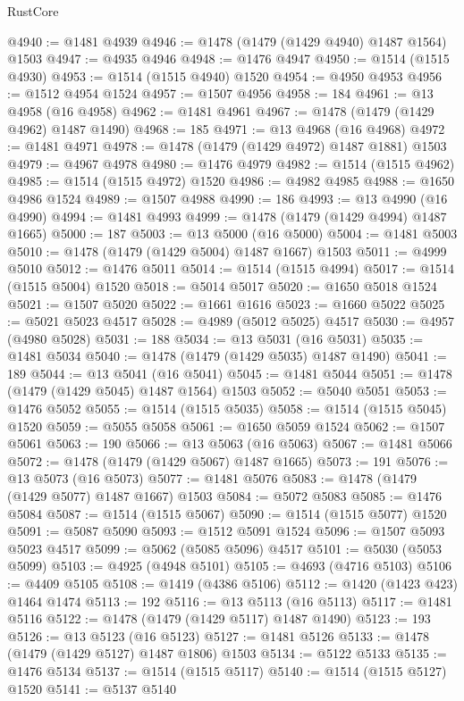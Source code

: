 \begin{lexlean}{RustCore}
\begin{coremodule}
@4940 := @1481 @4939
@4946 := @1478 (@1479 (@1429 @4940) @1487 @1564) @1503
@4947 := @4935 @4946
@4948 := @1476 @4947
@4950 := @1514 (@1515 @4930)
@4953 := @1514 (@1515 @4940) @1520
@4954 := @4950 @4953
@4956 := @1512 @4954 @1524
@4957 := @1507 @4956
@4958 := 184
@4961 := @13 @4958 (@16 @4958)
@4962 := @1481 @4961
@4967 := @1478 (@1479 (@1429 @4962) @1487 @1490)
@4968 := 185
@4971 := @13 @4968 (@16 @4968)
@4972 := @1481 @4971
@4978 := @1478 (@1479 (@1429 @4972) @1487 @1881) @1503
@4979 := @4967 @4978
@4980 := @1476 @4979
@4982 := @1514 (@1515 @4962)
@4985 := @1514 (@1515 @4972) @1520
@4986 := @4982 @4985
@4988 := @1650 @4986 @1524
@4989 := @1507 @4988
@4990 := 186
@4993 := @13 @4990 (@16 @4990)
@4994 := @1481 @4993
@4999 := @1478 (@1479 (@1429 @4994) @1487 @1665)
@5000 := 187
@5003 := @13 @5000 (@16 @5000)
@5004 := @1481 @5003
@5010 := @1478 (@1479 (@1429 @5004) @1487 @1667) @1503
@5011 := @4999 @5010
@5012 := @1476 @5011
@5014 := @1514 (@1515 @4994)
@5017 := @1514 (@1515 @5004) @1520
@5018 := @5014 @5017
@5020 := @1650 @5018 @1524
@5021 := @1507 @5020
@5022 := @1661 @1616
@5023 := @1660 @5022
@5025 := @5021 @5023 @4517
@5028 := @4989 (@5012 @5025) @4517
@5030 := @4957 (@4980 @5028)
@5031 := 188
@5034 := @13 @5031 (@16 @5031)
@5035 := @1481 @5034
@5040 := @1478 (@1479 (@1429 @5035) @1487 @1490)
@5041 := 189
@5044 := @13 @5041 (@16 @5041)
@5045 := @1481 @5044
@5051 := @1478 (@1479 (@1429 @5045) @1487 @1564) @1503
@5052 := @5040 @5051
@5053 := @1476 @5052
@5055 := @1514 (@1515 @5035)
@5058 := @1514 (@1515 @5045) @1520
@5059 := @5055 @5058
@5061 := @1650 @5059 @1524
@5062 := @1507 @5061
@5063 := 190
@5066 := @13 @5063 (@16 @5063)
@5067 := @1481 @5066
@5072 := @1478 (@1479 (@1429 @5067) @1487 @1665)
@5073 := 191
@5076 := @13 @5073 (@16 @5073)
@5077 := @1481 @5076
@5083 := @1478 (@1479 (@1429 @5077) @1487 @1667) @1503
@5084 := @5072 @5083
@5085 := @1476 @5084
@5087 := @1514 (@1515 @5067)
@5090 := @1514 (@1515 @5077) @1520
@5091 := @5087 @5090
@5093 := @1512 @5091 @1524
@5096 := @1507 @5093 @5023 @4517
@5099 := @5062 (@5085 @5096) @4517
@5101 := @5030 (@5053 @5099)
@5103 := @4925 (@4948 @5101)
@5105 := @4693 (@4716 @5103)
@5106 := @4409 @5105
@5108 := @1419 (@4386 @5106)
@5112 := @1420 (@1423 @423) @1464 @1474
@5113 := 192
@5116 := @13 @5113 (@16 @5113)
@5117 := @1481 @5116
@5122 := @1478 (@1479 (@1429 @5117) @1487 @1490)
@5123 := 193
@5126 := @13 @5123 (@16 @5123)
@5127 := @1481 @5126
@5133 := @1478 (@1479 (@1429 @5127) @1487 @1806) @1503
@5134 := @5122 @5133
@5135 := @1476 @5134
@5137 := @1514 (@1515 @5117)
@5140 := @1514 (@1515 @5127) @1520
@5141 := @5137 @5140

\end{coremodule}
\end{lexlean}
